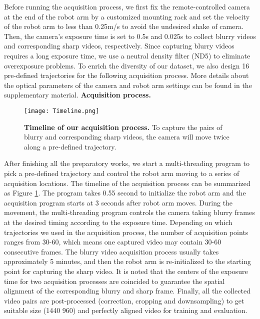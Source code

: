 \documentclass[letterpaper]{article} \usepackage{aaai22}  \usepackage{times}  \usepackage{helvet}  \usepackage{courier}  \usepackage[hyphens]{url}  \usepackage{graphicx} \urlstyle{rm} \def\UrlFont{\rm}  \usepackage{natbib}  \usepackage{caption} \DeclareCaptionStyle{ruled}{labelfont=normalfont,labelsep=colon,strut=off} \frenchspacing  \setlength{\pdfpagewidth}{8.5in}  \setlength{\pdfpageheight}{11in}  \newcommand{\hang}{\textcolor[rgb]{0.98,0.5,0.04}}
\begin{document}
Before running the acquisition process, we first fix the remote-controlled camera at the end of the robot arm by a customized mounting rack and set the velocity of the robot arm to less than 0.25m/s to avoid the undesired shake of camera.
Then, the camera's exposure time is set to 0.5s and 0.025s to collect blurry videos and corresponding sharp videos, respectively. 
Since capturing blurry videos requires a long exposure time, we use a neutral density filter (ND5) to eliminate overexposure problems.
To enrich the diversity of our dataset, we also design 16 pre-defined trajectories for the following acquisition process.
More details about the optical parameters of the camera and robot arm settings can be found in the supplementary material.
\newline
{\bf Acquisition process.}  \begin{figure}[!t] 
  \centering
  \texttt{[image: Timeline.png]}
  \vspace{-2mm}
  \caption{\textbf{Timeline of our acquisition process.} To capture the pairs of blurry and corresponding sharp videos, the camera will move twice along a pre-defined trajectory.}
\label{fig:Video_Timeline}
\vspace{-6mm}
\end{figure}
After finishing all the preparatory works, we start a multi-threading program to pick a pre-defined trajectory and control the robot arm moving to a series of acquisition locations.
The timeline of the acquisition process can be summarized as Figure \ref{fig:Video_Timeline}.
The program takes 0.55 second to initialize the robot arm and the acquisition program starts at 3 seconds after robot arm moves.
During the movement, the multi-threading program controls the camera taking blurry frames at the desired timing according to the exposure time.
Depending on which trajectories we used in the acquisition process, the number of acquisition points ranges from 30-60, which means one captured video may contain 30-60 consecutive frames.
The blurry video acquisition process usually takes approximately 5 minutes, and then the robot arm is re-initialized to the starting point for capturing the sharp video.
It is noted that the centers of the exposure time for two acquisition processes are coincided to guarantee the spatial alignment of the corresponding blurry and sharp frame. 
Finally, all the collected video pairs are post-processed (correction, cropping and downsampling) to get suitable size (1440  960) and perfectly aligned video for training and evaluation.
\end{document}
